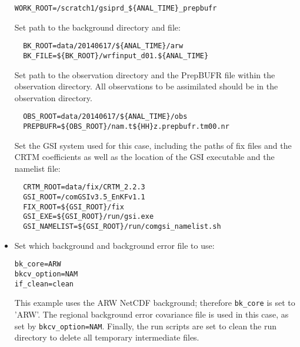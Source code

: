 \begin{itemize}
\begin{scriptsize}
\begin{verbatim}
WORK_ROOT=/scratch1/gsiprd_${ANAL_TIME}_prepbufr
\end{verbatim}
\end{scriptsize}

Set path to the background directory and file: 

\begin{scriptsize}
\begin{verbatim}
  BK_ROOT=data/20140617/${ANAL_TIME}/arw
  BK_FILE=${BK_ROOT}/wrfinput_d01.${ANAL_TIME}
\end{verbatim}
\end{scriptsize}

Set path to the observation directory and the PrepBUFR file within the observation directory. All observations to be assimilated should be in the observation directory. 

\begin{scriptsize}
\begin{verbatim}
  OBS_ROOT=data/20140617/${ANAL_TIME}/obs
  PREPBUFR=${OBS_ROOT}/nam.t${HH}z.prepbufr.tm00.nr
\end{verbatim}
\end{scriptsize}

Set the GSI system used for this case, including the paths of  fix files and the CRTM coefficients as well as the location of the GSI executable and the namelist file: 

\begin{scriptsize}
\begin{verbatim}
  CRTM_ROOT=data/fix/CRTM_2.2.3
  GSI_ROOT=/comGSIv3.5_EnKFv1.1
  FIX_ROOT=${GSI_ROOT}/fix
  GSI_EXE=${GSI_ROOT}/run/gsi.exe
  GSI_NAMELIST=${GSI_ROOT}/run/comgsi_namelist.sh
\end{verbatim}
\end{scriptsize}

\item Set which background and background error file to use:

\begin{scriptsize}
\begin{verbatim}
bk_core=ARW
bkcv_option=NAM
if_clean=clean 
\end{verbatim}
\end{scriptsize}

This example uses the ARW NetCDF background; therefore \verb|bk_core| is set to 'ARW'.  The regional background error covariance file is used in this case, as set by \verb|bkcv_option=NAM|.  Finally, the run scripts are set to clean the run directory to delete all temporary intermediate files.
\end{itemize}

